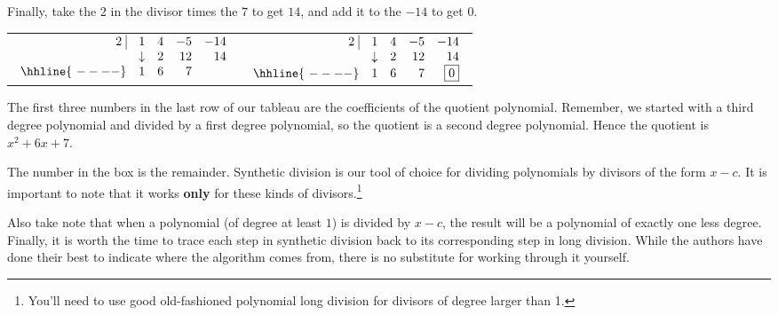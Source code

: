 \documentclass{ximera}
\begin{document}
Finally, take the $2$ in the divisor times the $7$ to get $14$, and add it to the $-14$ to get $0$.

\bigskip

\begin{center}

\begin{tabular}{cc}

$ \begin{array}{rrrrr}


  2 \, \, \vline& 1 & 4 & -5  & -14 \\

   & \downarrow &  2  &  12  & 14 \\ \hhline{~----} 
  & 1  &   6  & 7  &    \\  
\end{array}$ \hspace{1in} 

&

$ \begin{array}{rrrrr}


  2 \, \, \vline& 1 & 4 & -5  & -14 \\

   & \downarrow &  2  &  12  & 14 \\ \hhline{~----} 
  & 1  &   6  & 7  &  \fbox{$0$}  \\  
\end{array}$ \\



\end{tabular}

\end{center}

The first three numbers in the last row of our tableau are the coefficients of the quotient polynomial.  Remember, we started with a third degree polynomial and divided by a first degree polynomial, so the quotient is a second degree polynomial.  Hence the quotient is $x^2+6x+7$.  

\medskip

The number in the box is the remainder.  Synthetic division is our tool of choice for dividing polynomials by divisors of the form $x-c$.  It is important to note that it works \textbf{only} for these kinds of divisors.\footnote{You'll need to use good old-fashioned polynomial long division for divisors of degree larger than 1.} 

\medskip

Also take note that when a polynomial (of degree at least $1$) is divided by $x-c$, the result will be a polynomial of exactly one less degree. Finally, it is  worth the time to trace each step in synthetic division back to its corresponding step in long division.  While the authors have done their best to indicate where the algorithm comes from, there is no substitute for working through it yourself.
\end{document}
